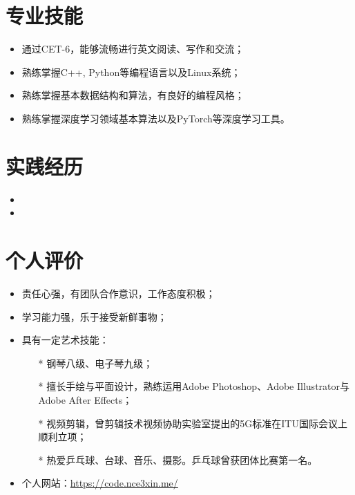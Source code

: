 \documentclass{resume}
\begin{document}
\section{专业技能}
\begin{itemize}[parsep=0.5ex]
  \item 通过CET-6，能够流畅进行英文阅读、写作和交流；
  \item 熟练掌握C++, Python等编程语言以及Linux系统；
  \item 熟练掌握基本数据结构和算法，有良好的编程风格；
  \item 熟练掌握深度学习领域基本算法以及PyTorch等深度学习工具。
\end{itemize}

\section{实践经历}
\begin{itemize}[parsep=0.5ex]
  \item {}
  \item {}
\end{itemize}

\section{个人评价}
\begin{itemize}[parsep=0.5ex]
  \item 责任心强，有团队合作意识，工作态度积极；
  \item 学习能力强，乐于接受新鲜事物；
  \item 具有一定艺术技能：
  \begin{itemize}[parsep=0.5ex]
    \item[*] 钢琴八级、电子琴九级；
    \item[*] 擅长手绘与平面设计，熟练运用Adobe Photoshop、Adobe Illustrator与Adobe After Effects；
    \item[*] 视频剪辑，曾剪辑技术视频协助实验室提出的5G标准在ITU国际会议上顺利立项；
    \item[*] 热爱乒乓球、台球、音乐、摄影。乒乓球曾获团体比赛第一名。
  \end{itemize}
  \item 个人网站：\href{https://code.nce3xin.me/}{https://code.nce3xin.me/}
\end{itemize}

%
%
\end{document}
